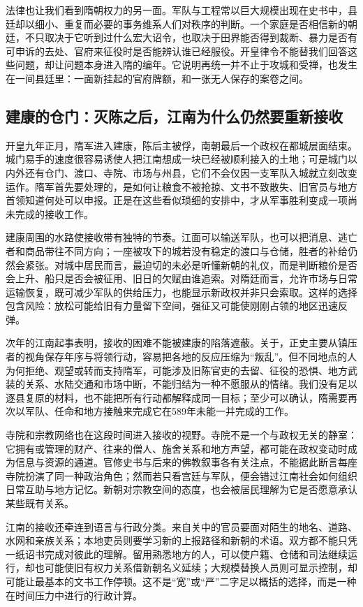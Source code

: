 法律也让我们看到隋朝权力的另一面。军队与工程常以巨大规模出现在史书中，县廷却以细小、重复而必要的事务维系人们对秩序的判断。一个家庭是否相信新的朝廷，不只取决于它听到过什么宏大诏令，也取决于田界能否得到裁断、暴力是否有可申诉的去处、官府来征役时是否能辨认谁已经服役。开皇律令不能替我们回答这些问题，却让问题本身进入隋的编年。它说明再统一并不止于攻城和受禅，也发生在一间县廷里：一面新挂起的官府牌额，和一张无人保存的案卷之间。

\subsection{建康的仓门：灭陈之后，江南为什么仍然要重新接收}
开皇九年正月，隋军进入建康，陈后主被俘，南朝最后一个政权在都城层面结束。城门易手的速度很容易诱使人把江南想成一块已经被顺利接入的土地；可是城门以内外还有仓门、渡口、寺院、市场与州县，它们不会仅因一支军队入城就立刻改变运作。隋军首先要处理的，是如何让粮食不被抢掠、文书不致散失、旧官员与地方首领知道何处可以申报。正是在这些看似琐细的安排中，才从军事胜利变成一项尚未完成的接收工作。

建康周围的水路使接收带有独特的节奏。江面可以输送军队，也可以把消息、逃亡者和商品带往不同方向；一座被攻下的城若没有稳定的渡口与仓储，胜者的补给仍然会紧张。对城中居民而言，最迫切的未必是听懂新朝的礼仪，而是判断粮价是否会上升、船只是否会被征用、旧日的欠赋由谁追索。对隋廷而言，允许市场与日常运输恢复，既可减少军队的供给压力，也能显示新政权并非只会索取。这样的选择包含风险：放松可能给旧有力量留下空间，强征又可能使刚刚占领的地区迅速反弹。

次年的江南起事表明，接收的困难不能被建康的陷落遮蔽。关于，正史主要从镇压者的视角保存年序与将领行动，容易把各地的反应压缩为“叛乱”。但不同地点的人为何拒绝、观望或转而支持隋军，可能涉及旧陈官吏的去留、征役的恐惧、地方武装的关系、水陆交通和市场中断，不能归结为一种不愿服从的情绪。我们没有足以逐县复原的材料，也不能把所有行动都解释成同一目标；至少可以确认，隋需要再次以军队、任命和地方接触来完成它在589年未能一并完成的工作。

寺院和宗教网络也在这段时间进入接收的视野。寺院不是一个与政权无关的静室：它拥有或管理的财产、往来的僧人、施舍关系和地方声望，都可能在政权变动时成为信息与资源的通道。官修史书与后来的佛教叙事各有关注点，不能据此断言每座寺院扮演了同一种政治角色；然而若只看宫廷与军队，便会错过江南社会如何组织日常互助与地方记忆。新朝对宗教空间的态度，也会被居民理解为它是否愿意承认某些既有关系。

江南的接收还牵连到语言与行政分类。来自关中的官员要面对陌生的地名、道路、水网和亲族关系；本地吏员则要学习新的上报路径和新朝的术语。双方都不能只凭一纸诏书完成对彼此的理解。留用熟悉地方的人，可以使户籍、仓储和司法继续运行，却也可能使旧有权力关系借新朝名义延续；大规模替换人员则可显示控制，却可能让最基本的文书工作停顿。这不是“宽”或“严”二字足以概括的选择，而是一种在时间压力中进行的行政计算。

